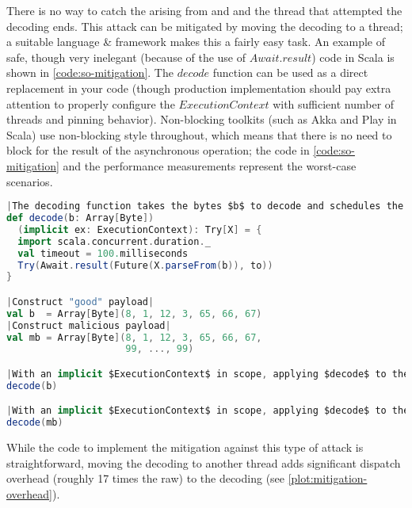 There is no way to catch the  arising from  and  and the thread that attempted the decoding ends. This attack can be mitigated by moving the decoding to a thread; a suitable language \& framework makes this a fairly easy task. An example of safe, though very inelegant (because of the use of $Await.result$) code in Scala is shown in \autoref{code:so-mitigation}. The $decode$ function can be used as a direct replacement in your code (though production implementation should pay extra attention to properly configure the $ExecutionContext$ with sufficient number of threads and pinning behavior). Non-blocking toolkits (such as Akka\cite{akka} and Play\cite{play} in Scala) use non-blocking style throughout, which means that there is no need to block for the result of the asynchronous operation; the code in \autoref{code:so-mitigation} and the performance measurements represent the worst-case scenarios.

\begin{lstlisting}[caption={Stack Overflow Mitigation}, label={code:so-mitigation}, language=Scala, escapechar=|]
|The decoding function takes the bytes $b$ to decode and schedules the decoding in the $ec$. It returns the result of the decoding, but will survive a $StackOverflowError$.|
def decode(b: Array[Byte])
  (implicit ex: ExecutionContext): Try[X] = {
  import scala.concurrent.duration._
  val timeout = 100.milliseconds
  Try(Await.result(Future(X.parseFrom(b)), to))
}

|Construct "good" payload|
val b  = Array[Byte](8, 1, 12, 3, 65, 66, 67)
|Construct malicious payload|
val mb = Array[Byte](8, 1, 12, 3, 65, 66, 67, 
                     99, ..., 99)

|With an implicit $ExecutionContext$ in scope, applying $decode$ to the good payload $b$ returns $Success(X(...))$ in roughly \SI{17}{\milli \second}.|
decode(b)

|With an implicit $ExecutionContext$ in scope, applying $decode$ to the good payload $b$ returns $Failure(TimeoutException)$ after the timeout of \SI{100}{\milli \second} elapses.|
decode(mb)
\end{lstlisting}

While the code to implement the mitigation against this type of attack is straightforward, moving the decoding to another thread adds significant dispatch overhead (roughly 17 times the raw) to the decoding (see \autoref{plot:mitigation-overhead}). 

